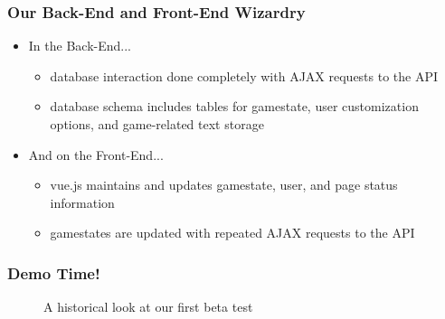 \documentclass[t]{beamer}
\begin{document}
    \begin{frame}
        \frametitle{Our Back-End and Front-End Wizardry}
        \begin{itemize}
          \item In the Back-End...
          \begin{itemize}
              \item database interaction done completely with AJAX requests to the API
              \item database schema includes tables for gamestate, user customization options, and game-related text storage
          \end{itemize}
          \item And on the Front-End...
          \begin{itemize}
            \item vue.js maintains and updates gamestate, user, and page status information
            \item gamestates are updated with repeated AJAX requests to the API
          \end{itemize}
        \end{itemize}
    \end{frame}

    \begin{frame}
        \frametitle{Demo Time!}
        \begin{figure}
            \begin{center}
            \end{center}
            \caption{A historical look at our first beta test}
        \end{figure}
    \end{frame}
\end{document}
